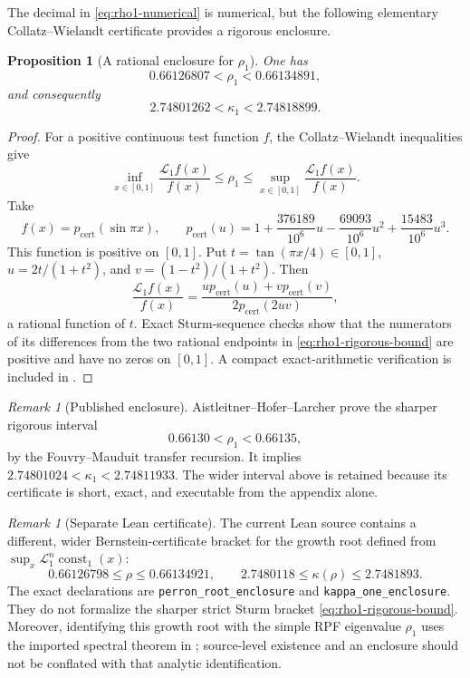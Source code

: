 \documentclass[11pt,oneside]{article}
\numberwithin{equation}{section}
\newtheorem{proposition}[theorem]{Proposition}
\theoremstyle{definition}
\theoremstyle{remark}
\newtheorem{remark}[theorem]{Remark}
\newcommand{\decl}[1]{\nolinkurl{#1}}
\newcommand{\ConstantOneFunction}{\operatorname{const}_{1}}
\newcommand{\CertificatePolynomial}{p_{\mathrm{cert}}}
\begin{document}
The decimal in \eqref{eq:rho1-numerical} is numerical, but the following elementary
Collatz--Wielandt certificate provides a rigorous enclosure.

\begin{proposition}[A rational enclosure for $\rho_1$]
\label{prop:rho1-rigorous-bound}
One has
\begin{equation}
 0.66126807<\rho_1<0.66134891,
 \label{eq:rho1-rigorous-bound}
\end{equation}
and consequently
\begin{equation}
 2.74801262<\kappa_1<2.74818899.
 \label{eq:kappa1-rigorous-bound}
\end{equation}
\end{proposition}

\begin{proof}
For a positive continuous test function $f$, the Collatz--Wielandt inequalities give
\[
 \inf_{x\in[0,1]}\frac{\mathcal L_1f(x)}{f(x)}
 \le\rho_1\le
 \sup_{x\in[0,1]}\frac{\mathcal L_1f(x)}{f(x)}.
\]
Take
\[
 f(x)=\CertificatePolynomial(\sin\pi x),\qquad
 \CertificatePolynomial(u)=1+\frac{376189}{10^6}u-\frac{69093}{10^6}u^2
       +\frac{15483}{10^6}u^3.
\]
This function is positive on $[0,1]$.  Put $t=\tan(\pi x/4)\in[0,1]$,
$u=2t/(1+t^2)$, and $v=(1-t^2)/(1+t^2)$.  Then
\[
 \frac{\mathcal L_1f(x)}{f(x)}
 =\frac{u\CertificatePolynomial(u)+v\CertificatePolynomial(v)}
 {2\CertificatePolynomial(2uv)},
\]
a rational function of $t$.  Exact Sturm-sequence checks show that the numerators of its
differences from the two rational endpoints in \eqref{eq:rho1-rigorous-bound} are positive
and have no zeros on $[0,1]$.  A compact exact-arithmetic verification is included in
.
\end{proof}

\begin{remark}[Published enclosure]
Aistleitner--Hofer--Larcher prove the sharper rigorous interval
\begin{equation}
 0.66130<\rho_1<0.66135,
 \label{eq:rho1-AHL}
\end{equation}
by the Fouvry--Mauduit transfer recursion.  It implies
$2.74801024<\kappa_1<2.74811933$.  The wider interval above is retained because its
certificate is short, exact, and executable from the appendix alone.
\end{remark}

\begin{remark}[Separate Lean certificate]
The current Lean source contains a different, wider Bernstein-certificate bracket for the
growth root defined from $\sup_x\mathcal L_1^n\ConstantOneFunction(x)$:
\[
 0.66126798\le\rho\le0.66134921,
 \qquad
 2.7480118\le\kappa(\rho)\le2.7481893.
\]
The exact declarations are \decl{perron_root_enclosure} and
\decl{kappa_one_enclosure}.  They do not formalize the sharper strict Sturm bracket
\eqref{eq:rho1-rigorous-bound}.  Moreover, identifying this growth root with the simple RPF
eigenvalue $\rho_1$ uses the imported spectral theorem in ; source-level
existence and an enclosure should not be conflated with that analytic identification.
\end{remark}
\end{document}
